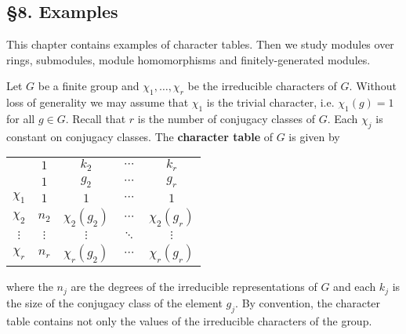 \chapter{}

\section*{\S8. Examples}

This chapter contains examples of character tables. Then we
study modules over rings, submodules, module homomorphisms
and finitely-generated modules. 

Let $G$ be a finite group and $\chi_1,\dots,\chi_r$ be the irreducible characters of $G$. Without loss of generality
we may assume that $\chi_1$ is the trivial character, i.e. $\chi_1(g)=1$ for all $g\in G$. 
Recall that $r$ is the number of conjugacy classes of $G$. Each $\chi_j$ is constant on conjugacy classes. 
The \textbf{character table} of 
$G$ is given by 
\begin{center}
\begin{tabular}{|c|cccc|}
\hline 
 & $1$ & $k_{2}$ & $\cdots$ & $k_{r}$\tabularnewline
 & $1$ & $g_{2}$ & $\cdots$ & $g_{r}$\tabularnewline
\hline 
$\chi_{1}$ & $1$ & $1$ & $\cdots$ & $1$\tabularnewline
$\chi_{2}$ & $n_{2}$ & $\chi_{2}(g_{2})$ & $\cdots$ & $\chi_{2}(g_{r})$\tabularnewline
$\vdots$ & $\vdots$ & $\vdots$ & $\ddots$ & $\vdots$\tabularnewline
$\chi_{r}$ & $n_{r}$ & $\chi_{r}(g_{2})$ & $\cdots$ & $\chi_{r}(g_{r})$\tabularnewline
\hline
\end{tabular}
\end{center}
where the $n_j$ are the degrees of the irreducible representations of $G$ and each $k_j$ is 
the size of the conjugacy class of the element $g_j$. By convention, the character table
contains not only the values of the irreducible characters of the group. 

